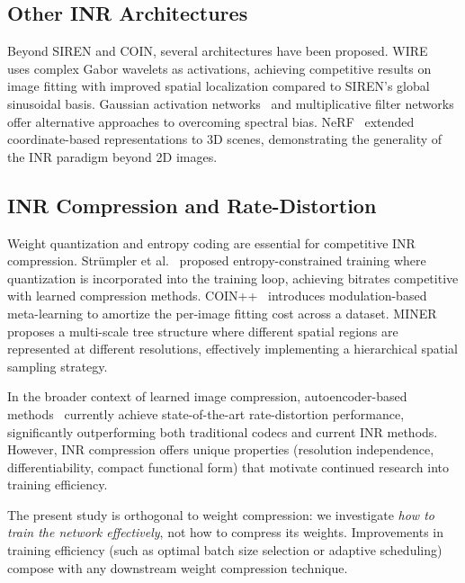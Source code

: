 \documentclass[a4paper,oneside,11pt,english]{scrartcl}
\begin{document}
\subsection{Other INR Architectures}

Beyond SIREN and COIN, several architectures have been proposed.
WIRE~\cite{saragadam2023wire} uses complex Gabor wavelets as activations,
achieving competitive results on image fitting with improved spatial
localization compared to SIREN's global sinusoidal basis.
Gaussian activation networks~\cite{ramasinghe2022beyond} and multiplicative
filter networks~\cite{fathony2021multiplicative} offer alternative approaches
to overcoming spectral bias.  NeRF~\cite{mildenhall2020nerf} extended
coordinate-based representations to 3D scenes, demonstrating the generality
of the INR paradigm beyond 2D images.

\subsection{INR Compression and Rate-Distortion}

Weight quantization and entropy coding are essential for competitive INR
compression.  Str\"umpler et al.~\cite{strumpler2022implicit} proposed
entropy-constrained training where quantization is incorporated into the
training loop, achieving bitrates competitive with learned compression
methods.  COIN++~\cite{dupont2022coinpp} introduces modulation-based
meta-learning to amortize the per-image fitting cost across a dataset.
MINER~\cite{saragadam2022miner} proposes a multi-scale tree structure where
different spatial regions are represented at different resolutions, effectively
implementing a hierarchical spatial sampling strategy.

In the broader context of learned image compression, autoencoder-based
methods~\cite{balle2018variational} currently achieve state-of-the-art
rate-distortion performance, significantly outperforming both traditional
codecs and current INR methods.  However, INR compression offers unique
properties (resolution independence, differentiability, compact functional
form) that motivate continued research into training efficiency.

The present study is orthogonal to weight compression: we investigate
\emph{how to train the network effectively}, not how to compress its weights.
Improvements in training efficiency (such as optimal batch size selection or
adaptive scheduling) compose with any downstream weight compression technique.
\end{document}
